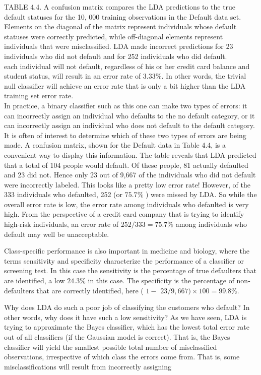 \documentclass[10pt]{article}
\begin{document}
TABLE 4.4. A confusion matrix compares the LDA predictions to the true default statuses for the 10, 000 training observations in the Default data set. Elements on the diagonal of the matrix represent individuals whose default statuses were correctly predicted, while off-diagonal elements represent individuals that were misclassified. LDA made incorrect predictions for 23 individuals who did not default and for 252 individuals who did default.\\
each individual will not default, regardless of his or her credit card balance and student status, will result in an error rate of $3.33 \%$. In other words, the trivial null classifier will achieve an error rate that is only a bit higher than the LDA training set error rate.\\
In practice, a binary classifier such as this one can make two types of errors: it can incorrectly assign an individual who defaults to the no default category, or it can incorrectly assign an individual who does not default to the default category. It is often of interest to determine which of these two types of errors are being made. A confusion matrix, shown for the Default data in Table 4.4, is a convenient way to display this information. The table reveals that LDA predicted that a total of 104 people would default. Of these people, 81 actually defaulted and 23 did not. Hence only 23 out of 9,667 of the individuals who did not default were incorrectly labeled. This looks like a pretty low error rate! However, of the 333 individuals who defaulted, 252 (or $75.7 \%$ ) were missed by LDA. So while the overall error rate is low, the error rate among individuals who defaulted is very high. From the perspective of a credit card company that is trying to identify high-risk individuals, an error rate of $252 / 333=75.7 \%$ among individuals who default may well be unacceptable.

Class-specific performance is also important in medicine and biology, where the terms sensitivity and specificity characterize the performance of a classifier or screening test. In this case the sensitivity is the percentage of true defaulters that are identified, a low $24.3 \%$ in this case. The specificity is the percentage of non-defaulters that are correctly identified, here ( $1-$ $23 / 9,667) \times 100=99.8 \%$.

Why does LDA do such a poor job of classifying the customers who default? In other words, why does it have such a low sensitivity? As we have seen, LDA is trying to approximate the Bayes classifier, which has the lowest total error rate out of all classifiers (if the Gaussian model is correct). That is, the Bayes classifier will yield the smallest possible total number of misclassified observations, irrespective of which class the errors come from. That is, some misclassifications will result from incorrectly assigning
\end{document}
